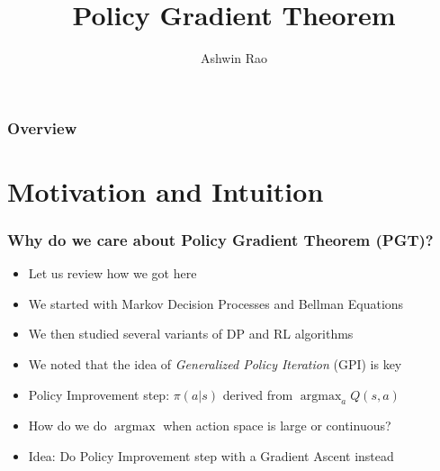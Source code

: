 \documentclass[handout]{beamer}
\title[Policy Gradient Theorem]{Policy Gradient Theorem} %
\author{Ashwin Rao} %
\institute[Stanford] %
{ICME, Stanford University
}
\date{} %
\DeclareMathOperator*{\argmax}{argmax}
\begin{document}
\begin{frame}
\titlepage %
\end{frame}

\begin{frame}
\frametitle{Overview} %
\tableofcontents %
\end{frame}

\section{Motivation and Intuition}


\begin{frame}
\frametitle{Why do we care about Policy Gradient Theorem (PGT)?}
\pause
\begin{itemize}[<+->]
\item Let us review how we got here
\item We started with Markov Decision Processes and Bellman Equations
\item We then studied several variants of DP and RL algorithms
\item We noted that the idea of {\em Generalized Policy Iteration} (GPI) is key
\item Policy Improvement step: $\pi(a|s)$ derived from $\argmax_a Q(s, a)$
\item How do we do $\argmax$ when action space is large or continuous?
\item Idea: Do Policy Improvement step with a Gradient Ascent instead
\end{itemize}
\end{frame}
\end{document}
